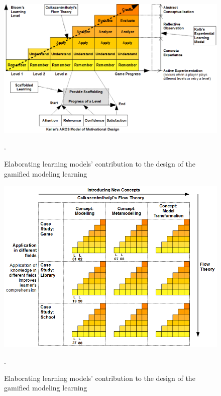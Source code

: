 \documentclass[12pt, a4paper]{report} \usepackage[titletoc]{appendix}
\begin{document}
\begin{figure}[ht]
\centering
\includegraphics[width=\textwidth]{learning-models}
\caption{Elaborating learning models' contribution to the design of the gamified modeling learning}.
\label{learning-models}
\end{figure}

\begin{figure}[ht]
\centering
\includegraphics[width=\textwidth]{learning-models2}
\caption{Elaborating learning models' contribution to the design of the gamified modeling learning}.
\label{learning-models2}
\end{figure}
\end{document}
